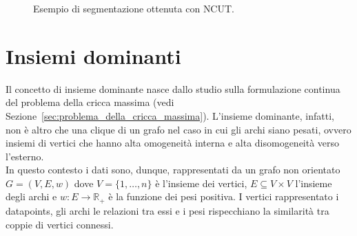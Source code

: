 \begin{figure}[h!]
	\centering
	\caption{Esempio di segmentazione ottenuta con NCUT.}
\end{figure}



\newpage


\section{Insiemi dominanti} %

Il concetto di insieme dominante nasce dallo studio sulla formulazione continua del problema della cricca massima (vedi Sezione~\ref{sec:problema_della_cricca_massima}). L'insieme dominante, infatti, non è altro che una clique di un grafo nel caso in cui gli archi siano pesati, ovvero insiemi di vertici che hanno alta omogeneità interna e alta disomogeneità verso l'esterno.\\

In questo contesto i dati sono, dunque, rappresentati da un grafo non orientato $G = (V, E , w)$ dove $V = \{ 1, \dots, n \}$ è l'insieme dei vertici, $E\subseteq V \times V$ l'insieme degli archi e $w : E \rightarrow \mathbb{R}_+$ è la funzione dei pesi positiva. I vertici rappresentato i datapoints, gli archi le relazioni tra essi e i pesi rispecchiano la similarità tra coppie di vertici connessi.\\

